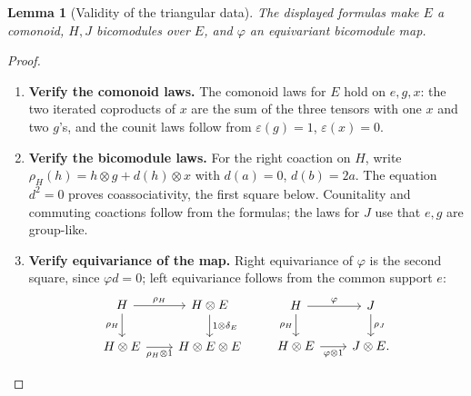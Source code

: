 \documentclass[11pt,reqno]{amsart}
\theoremstyle{plain}
\newtheorem{lemma}[theorem]{Lemma}
\theoremstyle{definition}
\theoremstyle{remark}
\numberwithin{equation}{section}
\newcommand{\eps}{\varepsilon}
\begin{document}
\begin{lemma}[Validity of the triangular data]\label{strong:lem:triangular-data}
The displayed formulas make $E$ a comonoid, $H,J$ bicomodules over
$E$, and $\varphi$ an equivariant bicomodule map.
\end{lemma}
\begin{proof}\leavevmode
\begin{enumerate}
\item \textbf{Verify the comonoid laws.} The comonoid laws for $E$ hold on $e,g,x$: the two iterated coproducts
of $x$ are the sum of the three tensors with one $x$ and two $g$'s,
and the counit laws follow from $\eps(g)=1$, $\eps(x)=0$.

\item \textbf{Verify the bicomodule laws.} For the right coaction on $H$, write
$\rho_H(h)=h\otimes g+d(h)\otimes x$ with $d(a)=0$, $d(b)=2a$.
The equation $d^2=0$ proves coassociativity, the first square below.
Counitality and commuting coactions follow from the formulas; the
laws for $J$ use that $e,g$ are group-like.

\item \textbf{Verify equivariance of the map.} Right equivariance of $\varphi$ is the second square, since
$\varphi d=0$; left equivariance follows from the common support $e$:
\[
\begin{tikzcd}[column sep=2.1em]
H \arrow[r,"\rho_H"] \arrow[d,"\rho_H"'] &
H\otimes E \arrow[d,"1\otimes\delta_E"]\\
H\otimes E \arrow[r,"\rho_H\otimes1"'] & H\otimes E\otimes E
\end{tikzcd}
\qquad
\begin{tikzcd}[column sep=2.1em]
H \arrow[r,"\varphi"] \arrow[d,"\rho_H"'] &
J \arrow[d,"\rho_J"]\\
H\otimes E \arrow[r,"\varphi\otimes1"'] & J\otimes E.
\end{tikzcd}\qedhere
\]
\end{enumerate}
\end{proof}
\end{document}
